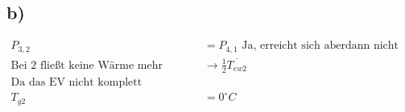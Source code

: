 

\subsection*{b)}

\begin{align*}
P_{3,2} &= P_{4,1} \text{ Ja, erreicht sich aberdann nicht verändert hat. Durch sehr gleich.} \\
\text{Bei 2 fließt keine Wärme mehr} &\rightarrow \frac{1}{2} \overline{T_{ew2}} \\
\text{Da das EV nicht komplett geschlossen ist, bleibt dessen Temp konstant} \\
T_{g2} &= 0^\circ C
\end{align*}